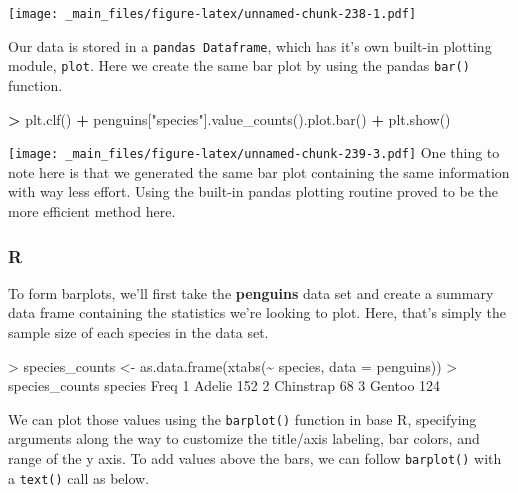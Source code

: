 \documentclass[
]{book}
\newenvironment{Shaded}{\begin{snugshade}}{\end{snugshade}}
\newcommand{\AttributeTok}[1]{\textcolor[rgb]{0.77,0.63,0.00}{#1}}
\newcommand{\DecValTok}[1]{\textcolor[rgb]{0.00,0.00,0.81}{#1}}
\newcommand{\FunctionTok}[1]{\textcolor[rgb]{0.00,0.00,0.00}{#1}}
\newcommand{\NormalTok}[1]{#1}
\newcommand{\OperatorTok}[1]{\textcolor[rgb]{0.81,0.36,0.00}{\textbf{#1}}}
\newcommand{\OtherTok}[1]{\textcolor[rgb]{0.56,0.35,0.01}{#1}}
\newcommand{\SpecialCharTok}[1]{\textcolor[rgb]{0.00,0.00,0.00}{#1}}
\newcommand{\StringTok}[1]{\textcolor[rgb]{0.31,0.60,0.02}{#1}}
\begin{document}
\texttt{[image: \_main\_files/figure-latex/unnamed-chunk-238-1.pdf]}

Our data is stored in a \texttt{pandas\ Dataframe}, which has it's own built-in plotting module, \texttt{plot}. Here we create the same bar plot by using the pandas \texttt{bar()} function.

\begin{Shaded}
\begin{Highlighting}[]
\OperatorTok{\textgreater{}}\NormalTok{ plt.clf()}
\OperatorTok{+}\NormalTok{ penguins[}\StringTok{"species"}\NormalTok{].value\_counts().plot.bar()}
\OperatorTok{+}\NormalTok{ plt.show()}
\end{Highlighting}
\end{Shaded}

\texttt{[image: \_main\_files/figure-latex/unnamed-chunk-239-3.pdf]}
One thing to note here is that we generated the same bar plot containing the same information with way less effort. Using the built-in pandas plotting routine proved to be the more efficient method here.

\hypertarget{r-40}{%
\subsubsection*{R}\label{r-40}}

To form barplots, we'll first take the \textbf{penguins} data set and create a summary data frame containing the statistics we're looking to plot. Here, that's simply the sample size of each species in the data set.

\begin{Shaded}
\begin{Highlighting}[]
\SpecialCharTok{\textgreater{}}\NormalTok{ species\_counts }\OtherTok{\textless{}{-}} \FunctionTok{as.data.frame}\NormalTok{(}\FunctionTok{xtabs}\NormalTok{(}\SpecialCharTok{\textasciitilde{}}\NormalTok{ species, }\AttributeTok{data =}\NormalTok{ penguins))}
\SpecialCharTok{\textgreater{}}\NormalTok{ species\_counts}
\NormalTok{    species Freq}
\DecValTok{1}\NormalTok{    Adelie  }\DecValTok{152}
\DecValTok{2}\NormalTok{ Chinstrap   }\DecValTok{68}
\DecValTok{3}\NormalTok{    Gentoo  }\DecValTok{124}
\end{Highlighting}
\end{Shaded}

We can plot those values using the \texttt{barplot()} function in base R, specifying arguments along the way to customize the title/axis labeling, bar colors, and range of the y axis. To add values above the bars, we can follow \texttt{barplot()} with a \texttt{text()} call as below.
\end{document}
